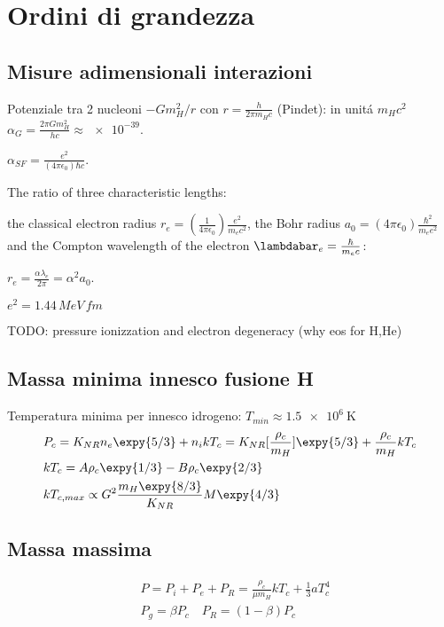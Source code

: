 \section{Ordini di grandezza}

\subsection{Misure adimensionali interazioni}

Potenziale tra 2 nucleoni $-Gm_H^2/r$ con $r=\frac{h}{2\pi m_Hc}$ (Pindet): in unit\'a $m_Hc^2$ $\alpha_G=\frac{2\pi Gm_H^2}{hc}\approx\num{e-39}$.

$\alpha_{SF}=\frac{e^2}{(4\pi\epsilon_0)\hbar c}$.

The ratio of three characteristic lengths:

the classical electron radius $r_e=(\frac{1}{4\pi\epsilon_0})\frac{e^2}{m_ec^2}$, the Bohr radius $a_0=(4\pi\epsilon_0)\frac{\hbar^2}{m_ee^2}$  and the Compton wavelength of the electron $\lambdabar_e=\frac{\hbar}{m_ec}$:

$r_e=\frac{\alpha\lambda_e}{2\pi}=\alpha^2a_0$.

$e^2=1.44\,MeV\,fm$

TODO: pressure ionizzation and electron degeneracy (why eos for H,He)

\subsection{Massa minima innesco fusione H}

Temperatura minima per innesco idrogeno: $T_{min}\approx\SI{1.5e6}{\kelvin}$
\begin{align*}

&P_c=K_{NR}n_e\expy{5/3}+n_ikT_c=K_{NR}[\frac{\rho_c}{m_H}]\expy{5/3}+\frac{\rho_c}{m_H}kT_c\\
&kT_c=A\rho_c\expy{1/3}-B\rho_c\expy{2/3}\\
&kT_{c,max}\propto G^2\frac{m_H\expy{8/3}}{K_{NR}}M\expy{4/3}
\end{align*}

\subsection{Massa massima}

\begin{align*}
&P=P_i+P_e+P_R=\frac{\rho_c}{\mu m_H}kT_c+\frac{1}{3}aT_c^4\\
&P_g=\beta P_c\quad P_R=(1-\beta)P_c
\end{align*}

